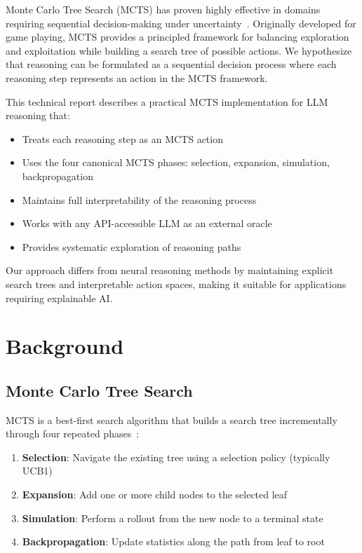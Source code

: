 \documentclass[conference]{IEEEtran}
\begin{document}
Monte Carlo Tree Search (MCTS) has proven highly effective in domains requiring sequential decision-making under uncertainty~\cite{browne2012survey}. Originally developed for game playing, MCTS provides a principled framework for balancing exploration and exploitation while building a search tree of possible actions. We hypothesize that reasoning can be formulated as a sequential decision process where each reasoning step represents an action in the MCTS framework.

This technical report describes a practical MCTS implementation for LLM reasoning that:
\begin{itemize}
\item Treats each reasoning step as an MCTS action
\item Uses the four canonical MCTS phases: selection, expansion, simulation, backpropagation
\item Maintains full interpretability of the reasoning process
\item Works with any API-accessible LLM as an external oracle
\item Provides systematic exploration of reasoning paths
\end{itemize}

Our approach differs from neural reasoning methods by maintaining explicit search trees and interpretable action spaces, making it suitable for applications requiring explainable AI.

\section{Background}

\subsection{Monte Carlo Tree Search}

MCTS is a best-first search algorithm that builds a search tree incrementally through four repeated phases~\cite{kocsis2006bandit}:

\begin{enumerate}
\item \textbf{Selection}: Navigate the existing tree using a selection policy (typically UCB1)
\item \textbf{Expansion}: Add one or more child nodes to the selected leaf
\item \textbf{Simulation}: Perform a rollout from the new node to a terminal state
\item \textbf{Backpropagation}: Update statistics along the path from leaf to root
\end{enumerate}
\end{document}
